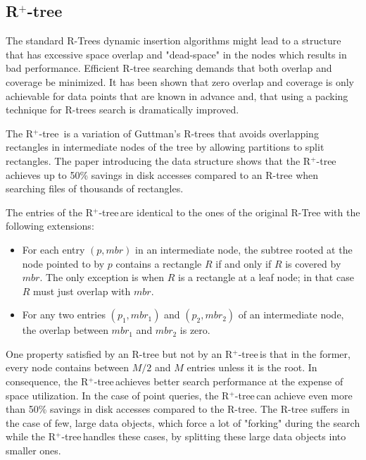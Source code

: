 \documentclass[11pt, a4paper, oneside]{article}
\newcommand{\rplus}{R$^+$-tree$\,$}
\begin{document}
\subsection{\rplus}

The standard R-Trees dynamic insertion algorithms might lead to a structure that has excessive space overlap and "dead-space" in the nodes which results in bad performance. Efficient R-tree searching demands that both overlap and coverage be minimized. It has been shown that zero overlap and coverage is only achievable for data points that are known in advance and, that using a packing technique for R-trees search is dramatically improved\cite{Roussopoulos85directspatial}.

The \rplus \cite{Sellis:1987:RDI:645914.671636} is a variation of Guttman's R-trees that avoids overlapping rectangles in intermediate nodes of the tree by allowing partitions to split rectangles. The paper introducing the data structure shows that the \rplus achieves up to 50\% savings in disk accesses compared to an R-tree when searching files of thousands of rectangles.

The entries of the \rplus are identical to the ones of the original R-Tree with the following extensions\cite{Sellis:1987:RDI:645914.671636}:
\begin{itemize}
\item For each entry $(p,mbr)$ in an intermediate node, the subtree rooted at the node pointed to
by $p$ contains a rectangle $R$ if and only if $R$ is covered by $mbr$. The only exception is when
$R$ is a rectangle at a leaf node; in that case $R$ must just overlap with $mbr$.

\item For any two entries $(p_1 , mbr_1 )$ and $(p_2, mbr_2)$ of an intermediate node, the overlap between $mbr_1$ and $mbr_2$ is zero.

\end{itemize}

One property satisfied by an R-tree but not by an \rplus is that in the former, every node contains between $M/2$ and $M$ entries unless it is the root. In consequence, the \rplus achieves better search performance at the expense of space utilization. In the case of point queries, the \rplus can achieve  even more than 50\% savings in disk accesses compared to the R-tree. The R-tree suffers in the case of few, large data objects, which force a lot of "forking" during the search while the \rplus handles these cases, by splitting these large data objects into smaller ones.
\end{document}
